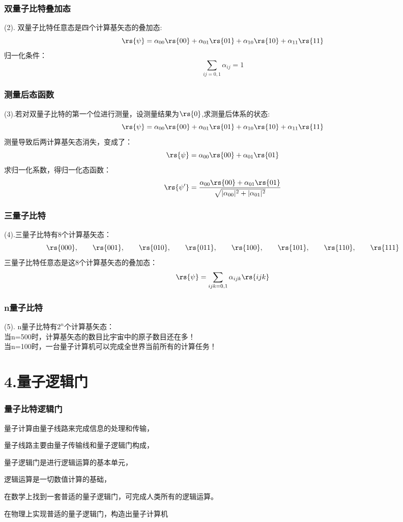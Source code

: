 \begin{frame} 
    \frametitle{双量子比特叠加态}
(2). 双量子比特任意态是四个计算基矢态的叠加态:
 \[\rs{\psi} =\alpha_{00}\rs{00}+\alpha_{01}\rs{01}+\alpha_{10}\rs{10}+\alpha_{11}\rs{11}\]
 归一化条件：
 \[ \sum_{ij=0,1} \alpha_{ij}= 1\]
\end{frame}

\begin{frame} 
    \frametitle{测量后态函数}
(3).若对双量子比特的第一个位进行测量，设测量结果为$\rs{0}$,求测量后体系的状态:
 \[\rs{\psi} =\alpha_{00}\rs{00}+\alpha_{01}\rs{01}+\alpha_{10}\rs{10}+\alpha_{11}\rs{11}\]
 测量导致后两计算基矢态消失，变成了：
 \[\rs{\psi} =\alpha_{00}\rs{00}+\alpha_{01}\rs{01}\]
 求归一化系数，得归一化态函数：
 \[\rs{\psi'} =\frac{\alpha_{00}\rs{00}+\alpha_{01}\rs{01}}{\sqrt{|\alpha_{00}|^2+ |\alpha_{01}|^2}} \]
\end{frame}

\begin{frame} 
    \frametitle{三量子比特}
(4).三量子比特有8个计算基矢态：\\
\[\rs{000}, \qquad \rs{001}, \qquad \rs{010}, \qquad \rs{011} , \qquad \rs{100}, \qquad \rs{101}, \qquad \rs{110}, \qquad \rs{111} \] 
三量子比特任意态是这8个计算基矢态的叠加态：
\[\rs{\psi} =\sum_{ijk=0,1} \alpha_{ijk}\rs{ijk}\] 
\end{frame}

\begin{frame} 
    \frametitle{n量子比特}
(5). n量子比特有$2^n$个计算基矢态：\\
{\Bullet} 当n=500时，计算基矢态的数目比宇宙中的原子数目还在多！\\
{\Bullet} 当n=100时，一台量子计算机可以完成全世界当前所有的计算任务！
\end{frame}

\section{4.量子逻辑门}

\begin{frame} 
    \frametitle{量子比特逻辑门}

{\Bullet} 量子计算由量子线路来完成信息的处理和传输，

{\Bullet} 量子线路主要由量子传输线和量子逻辑门构成，

{\Bullet} 量子逻辑门是进行逻辑运算的基本单元，

{\Bullet} 逻辑运算是一切数值计算的基础，

{\Bullet} 在数学上找到一套普适的量子逻辑门，可完成人类所有的逻辑运算。

{\Bullet} 在物理上实现普适的量子逻辑门，构造出量子计算机

\end{frame}


